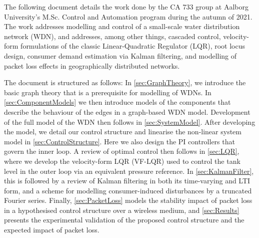 The following document details the work done by the CA 733 group at Aalborg University's M.Sc. Control and Automation program during the autumn of 2021. The work addresses modelling and control of a small-scale water distribution network (WDN), and addresses, among other things, cascaded control, velocity-form formulations of the classic Linear-Quadratic Regulator (LQR), root locus design, consumer demand estimation via Kalman filtering, and modelling of packet loss effects in geographically distributed networks.

The document is structured as follows: In \cref{sec:GraphTheory}, we introduce the basic graph theory that is a prerequisite for modelling of WDNs. In \cref{sec:ComponentModels} we then introduce models of the components that describe the behaviour of the edges in a graph-based WDN model. Development of the full model of the WDN then follows in \cref{sec:SystemModel}. After developing the model, we detail our control structure and linearise the non-linear system model in \cref{sec:ControlStructure}. Here we also design the PI controllers that govern the inner loop. A review of optimal control then follows in \cref{sec:LQR}, where we develop the velocity-form LQR (VF-LQR) used to control the tank level in the outer loop via an equivalent pressure reference. In \cref{sec:KalmanFilter}, this is followed by a review of Kalman filtering in both its time-varying and LTI form, and a scheme for modelling consumer-induced disturbances by a truncated Fourier series. Finally, \cref{sec:PacketLoss} models the stability impact of packet loss in a hypothesised control structure over a wireless medium, and \cref{sec:Results} presents the experimental validation of the proposed control structure and the expected impact of packet loss.